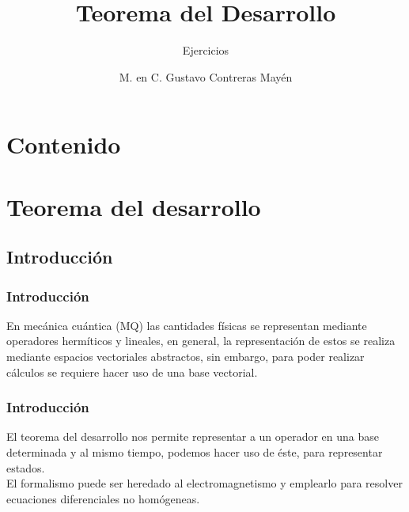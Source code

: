 
\title{\large{Teorema del Desarrollo}}
\subtitle{Ejercicios}
\author{M. en C. Gustavo Contreras Mayén}
\date{}

\maketitle
\fontsize{14}{14}\selectfont
{}
\section*{Contenido}
\section{Teorema del desarrollo}
\subsection{Introducción}
\begin{frame}
\frametitle{Introducción}
En mecánica cuántica (MQ) las cantidades físicas se representan mediante operadores hermíticos y lineales, en general, la representación de estos se realiza mediante espacios vectoriales abstractos, sin embargo, para poder realizar cálculos se requiere hacer uso de una base vectorial.
\end{frame}
\begin{frame}
\frametitle{Introducción}
El teorema del desarrollo nos permite representar a un operador en una base determinada y al mismo tiempo, podemos hacer uso de éste, para representar estados.
\\
\bigskip
\pause
El formalismo puede ser heredado al electromagnetismo y emplearlo para resolver ecuaciones diferenciales no homógeneas.
\end{frame}
